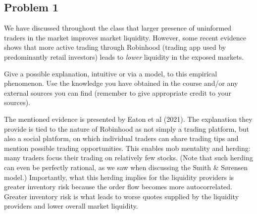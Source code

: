 

\ifexam

\subsection*{Problem 1}
	We have discussed throughout the class that larger presence of uninformed traders in the market improves market liquidity. However, some recent evidence shows that more active trading through Robinhood (trading app used by predominantly retail investors) leads to \emph{lower} liquidity in the exposed markets.
	
	Give a possible explanation, intuitive or via a model, to this empirical phenomenon. Use the knowledge you have obtained in the course and/or any external sources you can find (remember to give appropriate credit to your sources).



\begin{solution}
	The mentioned evidence is presented by Eaton et al (2021).\footnotemark 
	The explanation they provide is tied to the nature of Robinhood as not simply a trading platform, but also a social platform, on which individual traders can share trading tips and mention possible trading opportunities. This enables mob mentality and herding: many traders focus their trading on relatively few stocks. (Note that such herding can even be perfectly rational, as we saw when discussing the Smith \& S{\o}rensen model.) Importantly, what this herding implies for the liquidity providers is greater inventory risk because the order flow becomes more autocorrelated. Greater inventory risk is what leads to worse quotes supplied by the liquidity providers and lower overall market liquidity.
\end{solution}
\ifprintanswers
\fi




